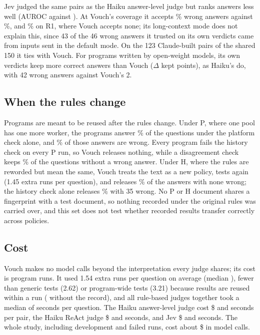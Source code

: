 Jev judged the same \rJevN{} pairs as the Haiku answer-level judge but ranks answers less well (AUROC \rJevAUROC{} against \rHaikuAnsAUROC{}). At Vouch's coverage it accepts \rJevErrClaude\% wrong answers against \rGateErrAnsSub\%, and \rJevErrOtf\% on \otf R1, where Vouch accepts none; its long-context mode does not explain this, since 43 of the 46 wrong answers it trusted on its own verdicts came from inputs sent in the default mode. On the 123 Claude-built pairs of the shared 150 it ties with Vouch. For programs written by open-weight models, its own verdicts keep more correct answers than Vouch ($\Delta$ kept \rJevDKeptOllama{} points), as Haiku's do, with 42 wrong answers against Vouch's 2.

\subsection{When the rules change}
\label{sec:results:reuse}

Programs are meant to be reused after the rules change. Under P, where one pool has one more worker, the programs answer \rPolPNoCheckCov\% of the questions under the platform check alone, and \rPolPNoCheckErr\% of those answers are wrong. Every program fails the history check on every P run, so Vouch releases nothing, while a disagreement check keeps \rPolPDisCov\% of the questions without a wrong answer. Under H, where the rules are reworded but mean the same, Vouch treats the text as a new policy, tests again (1.45 extra runs per question), and releases \rPolHGateCov\% of the answers with none wrong; the history check alone releases \rPolHHistCov\% with 35 wrong. No P or H document shares a fingerprint with a test document, so nothing recorded under the original rules was carried over, and this set does not test whether recorded results transfer correctly across policies.

\subsection{Cost}
\label{sec:results:cost}

Vouch makes no model calls beyond the interpretation every judge shares; its cost is program runs. It used 1.54 extra runs per question on average (median \rGateExecMedian), fewer than generic tests (2.62) or program-wide tests (3.21) because results are reused within a run (\rFreshExecPerQ{} without the record), and all rule-based judges together took a median of \rGateSecPerQ{} seconds per question. The Haiku answer-level judge cost \$\rAnsJudgeUSDPerRow{} and \rAnsJudgeSecPerRow{} seconds per pair, the Haiku ReAct judge \$\rReactUSDPerRow{} and \rReactSecPerRow{} seconds, and Jev \$\rJevUSDPerRow{} and \rJevSecPerRow{} seconds. The whole study, including development and failed runs, cost about \$\rTotalUSD{} in model calls.
